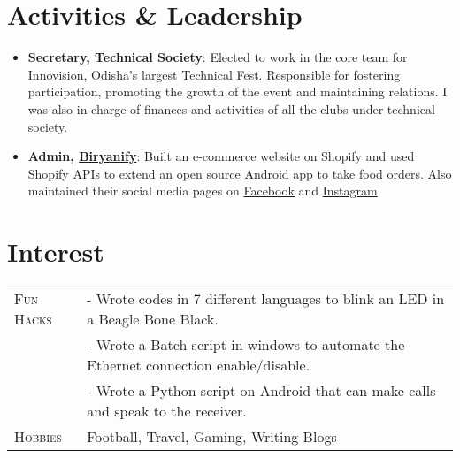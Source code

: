 \documentclass[a4paper,10pt]{extarticle} %
\begin{document}
\vspace{-0.6cm}
\section{\textcolor{primary}{Activities \& Leadership}}

\begin{itemize}[leftmargin=0.55cm, rightmargin=0.2cm, label={\Large\textbullet}]
\item \textbf{Secretary, {Technical Society}}: 
Elected to work in the core team for Innovision, Odisha's largest Technical Fest. Responsible for fostering participation, promoting the growth of the event and maintaining relations. I was also in-charge of finances and activities of all the clubs under technical society.

\item \textbf{Admin, \href{https://www.biryanify.com}{Biryanify}}: Built an e-commerce website on Shopify and used Shopify APIs to extend an open source Android app to take food orders. Also maintained their social media pages on \href{https://www.facebook.com/biryanify}{Facebook} and \href{https://www.instagram.com/biryanify/}{Instagram}.
\end{itemize}

\vspace{-0.15cm}
\section{\textcolor{primary}{Interest}}
\begin{tabularx}{\linewidth}{ l | X }
\textsc{Fun Hacks} & {- Wrote codes in 7 different languages to blink an LED in a Beagle Bone Black. }\\
& {- Wrote a Batch script in windows to automate the Ethernet connection enable/disable. }\\
& {- Wrote a Python script on Android that can make calls and speak to the receiver.  }\\

\textsc{Hobbies} & {Football, Travel, Gaming, Writing Blogs}\\


\end{tabularx}
\end{document}
